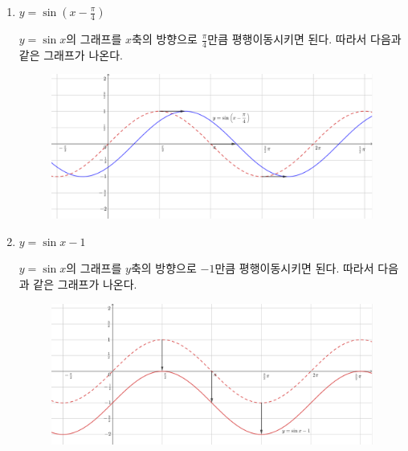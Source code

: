 \documentclass{oblivoir}
\begin{document}
\newpage
%
\begin{enumerate}\label{graph3}
\item
\(y=\sin(x-\frac\pi4)\)
\par\noindent
\(y=\sin x\)의 그래프를 \(x\)축의 방향으로 \(\frac\pi4\)만큼 평행이동시키면 된다.
따라서 다음과 같은 그래프가 나온다.
\begin{figure}[h!]
\centering
\includegraphics[width=\textwidth]{graph_3-1}
\end{figure}
\item
\(y=\sin x-1\)
\par\noindent
\(y=\sin x\)의 그래프를 \(y\)축의 방향으로 \(-1\)만큼 평행이동시키면 된다.
따라서 다음과 같은 그래프가 나온다.
\begin{figure}[h!]
\centering
\includegraphics[width=\textwidth]{graph_3-2}
\end{figure}
\end{enumerate}
\end{document}
